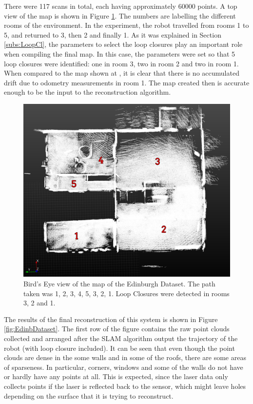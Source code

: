 \documentclass[11pt]{article}
\begin{document}
There were 117 scans in total, each having approximately 60000 points. A top view of the map is shown in Figure \ref{fig:TopViewEdinDataset}. The numbers are labelling the different rooms of the environment. In the experiment, the robot travelled from rooms 1 to 5, and returned to 3, then 2 and finally 1. As it was explained in Section \ref{subs:LoopCl}, the parameters to select the loop closures play an important role when compiling the final map. In this case, the parameters were set so that 5 loop closures were identified: one in room 3, two in room 2 and two in room 1. When compared to the map shown at \cite{AICPAlign}, it is clear that there is no accumulated drift due to odometry measurements in room 1. The map created then is accurate enough to be the input to the reconstruction algorithm.
	
\begin{figure}
\centering
\includegraphics[width=0.8\linewidth]{Maps1/TopViewMarked}
\caption{Bird's Eye view of the map of the Edinburgh Dataset. The path taken was 1, 2, 3, 4, 5, 3, 2, 1. Loop Closures were detected in rooms 3, 2 and 1.}
\label{fig:TopViewEdinDataset}
\end{figure}
	
The results of the final reconstruction of this system is shown in Figure \ref{fig:EdinbDataset}. The first row of the figure contains the raw point clouds collected and arranged after the SLAM algorithm output the trajectory of the robot (with loop closure included). It can be seen that even though the point clouds are dense in the some walls and in some of the roofs, there are some areas of sparseness. In particular, corners, windows and some of the walls do not have or hardly have any points at all. This is expected, since the laser data only collects points if the laser is reflected back to the sensor, which might leave holes depending on the surface that it is trying to reconstruct.
	
\end{document}
